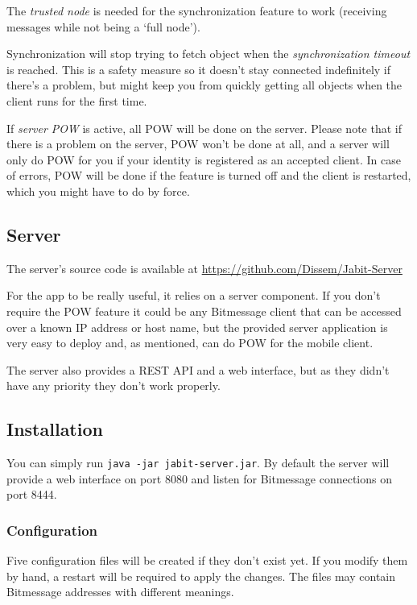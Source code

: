 \documentclass{bfh}
\begin{document}
  The \textit{trusted node} is needed for the synchronization feature to work (receiving messages while not being a `full node').

  Synchronization will stop trying to fetch object when the \textit{synchronization timeout} is reached. This is a safety measure so it doesn't stay connected indefinitely if there's a problem, but might keep you from quickly getting all objects when the client runs for the first time.

  If \textit{server POW} is active, all \ac{POW} will be done on the server. Please note that if there is a problem on the server, \ac{POW} won't be done at all, and a server will only do \ac{POW} for you if your identity is registered as an accepted client. In case of errors, \ac{POW} will be done if the feature is turned off and the client is restarted, which you might have to do by force.


  \subsection{Server}
  \label{subsec:server}
  The server's source code is available at \url{https://github.com/Dissem/Jabit-Server}

  For the app to be really useful, it relies on a server component. If you don't require the \ac{POW} feature it could be any Bitmessage client that can be accessed over a known \acs{IP} address or host name, but the provided server application is very easy to deploy and, as mentioned, can do \ac{POW} for the mobile client.

  The server also provides a \acs{REST} \ac{API} and a web interface, but as they didn't have any priority they don't work properly.

  \subsection{Installation}
  You can simply run \texttt{java -jar jabit-server.jar}. By default the server will provide a web interface on port 8080 and listen for Bitmessage connections on port 8444.

  \subsubsection{Configuration}
  Five configuration files will be created if they don't exist yet. If you modify them by hand, a restart will be required to apply the changes. The files may contain Bitmessage addresses with different meanings.
\end{document}
